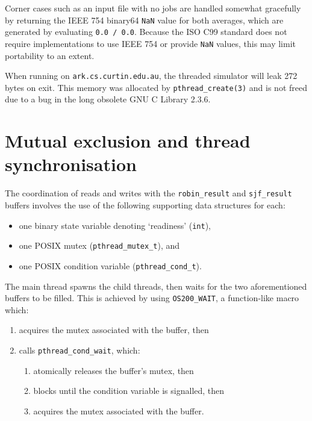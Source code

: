 \documentclass[a4paper,12pt,titlepage]{article}
\begin{document}
Corner cases such as an input file with no jobs are handled somewhat gracefully
by returning the IEEE 754 binary64 \texttt{NaN} value for both averages, which
are generated by evaluating \texttt{0.0 / 0.0}. Because the ISO C99 standard
does not require implementations to use IEEE 754 or provide \texttt{NaN}
values, this may limit portability to an extent.

When running on \texttt{ark.cs.curtin.edu.au}, the threaded simulator will leak
272 bytes on exit. This memory was allocated by \texttt{pthread\_create(3)} and
is not freed due to a bug in the long obsolete GNU C Library 2.3.6.

\newpage

\section{Mutual exclusion and thread synchronisation}

The coordination of reads and writes with the \texttt{robin\_result} and
\texttt{sjf\_result} buffers involves the use of the following supporting
data structures for each:

\begin{itemize}
	\item one binary state variable denoting `readiness' (\texttt{int}),
	\item one POSIX mutex (\texttt{pthread\_mutex\_t}), and
	\item one POSIX condition variable (\texttt{pthread\_cond\_t}).
\end{itemize}

The main thread spawns the child threads, then waits for the two
aforementioned buffers to be filled. This is achieved by using
\texttt{OS200\_WAIT}, a function-like macro which:

\begin{enumerate}
	\item acquires the mutex associated with the buffer, then
	\item calls \texttt{pthread\_cond\_wait}, which:
	\begin{enumerate}
		\item atomically releases the buffer's mutex, then
		\item blocks until the condition variable is signalled, then
		\item acquires the mutex associated with the buffer.
	\end{enumerate}
\end{enumerate}
\end{document}
